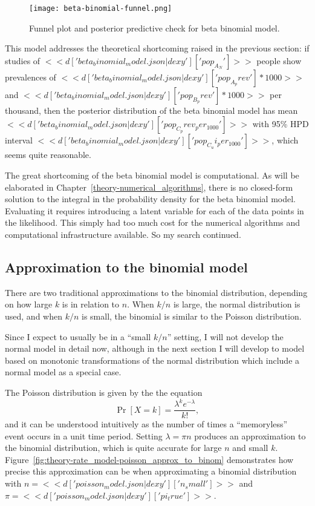 \begin{figure}[ht]
\begin{center}
\texttt{[image: beta-binomial-funnel.png]}
\end{center}
\caption{Funnel plot and posterior predictive check for beta binomial model.}
\label{fig:theory-rate_beta-binomial-funnel}
\end{figure}

This model addresses the theoretical shortcoming raised in the
previous section: if studies of
$<<d['beta_binomial_model.json|dexy']['pop_A_N']>>$ people show prevalences
of $<<d['beta_binomial_model.json|dexy']['pop_A_prev']*1000>>$ and
$<<d['beta_binomial_model.json|dexy']['pop_B_prev']*1000>>$ per thousand,
then the posterior distribution of the beta binomial model has mean
$<<d['beta_binomial_model.json|dexy']['pop_C_prev_per_1000']>>$ with 95\%
HPD interval $<<d['beta_binomial_model.json|dexy']['pop_C_ui_per_1000']>>$,
which seems quite reasonable.

The great shortcoming of the beta binomial model is computational.  As
will be elaborated in Chapter~\ref{theory-numerical_algorithms}, there
is no closed-form solution to the integral in the probability density
for the beta binomial model.  Evaluating it requires introducing a
latent variable for each of the data points in the likelihood.  This
simply had too much cost for the numerical algorithms and
computational infrastructure available.  So my search
continued.

\subsection{Approximation to the binomial model}
There are two traditional approximations to the binomial distribution,
depending on how large $k$ is in relation to $n$.  When $k/n$ is
large, the normal distribution is used, and when $k/n$ is small, the
binomial is similar to the Poisson distribution.

Since I expect to usually be in a ``small $k/n$'' setting, I will not
develop the normal model in detail now, although in the next section I
will develop to model based on monotonic transformations of the normal
distribution which include a normal model as a special case.

The Poisson distribution is given by the the equation
\[
\Pr[X=k] = \frac{\lambda^k e^{-\lambda}}{k!},
\]
and it can be understood intuitively as the number of times a
``memoryless'' event occurs in a unit time period.  Setting $\lambda =
\pi n$ produces an approximation to the binomial distribution, which
is quite accurate for large $n$ and small $k$.
Figure~\ref{fig:theory-rate_model-poisson_approx_to_binom}
demonstrates how precise this approximation can be when approximating
a binomial distribution with
$n=<<d['poisson_model.json|dexy']['n_small']>>$ and
$\pi=<<d['poisson_model.json|dexy']['pi_true']>>$.

